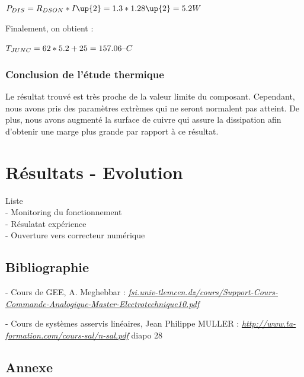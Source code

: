 \documentclass[11pt, french]{article} %
\begin{document}
\noindent
$
P_{DIS} = R_{DSON} * I\up{2} = 1.3 * 1.28\up{2} = 5.2 W
$

\vspace{0.5cm}

\noindent
Finalement, on obtient :

\vspace{0.5cm}

\noindent
$
T_{JUNC} = 62 * 5.2 + 25 = 157.06 \char123C
$

\subsubsection{Conclusion de l'étude thermique}

\noindent
Le résultat trouvé est très proche de la valeur limite du composant. Cependant, nous avons pris des paramètres extrèmes qui ne seront normalent pas atteint. De plus, nous avons augmenté la surface de cuivre qui assure la dissipation afin d'obtenir une marge plus grande par rapport à ce résultat. 

\section{Résultats - Evolution}
Liste
\\- Monitoring du fonctionnement
\\- Résulatat expérience
\\- Ouverture vers correcteur numérique


\subsection{Bibliographie}

- Cours de GEE, A. Meghebbar :
\newline \textit{\underline{fsi.univ-tlemcen.dz/cours/Support-Cours-Commande-Analogique-Master-Electrotechnique10.pdf}} 

- Cours de systèmes asservis linéaires, Jean Philippe MULLER : 
\newline \textit{\underline{http://www.ta-formation.com/cours-sal/n-sal.pdf}} diapo 28

\subsection{Annexe}
\end{document}
